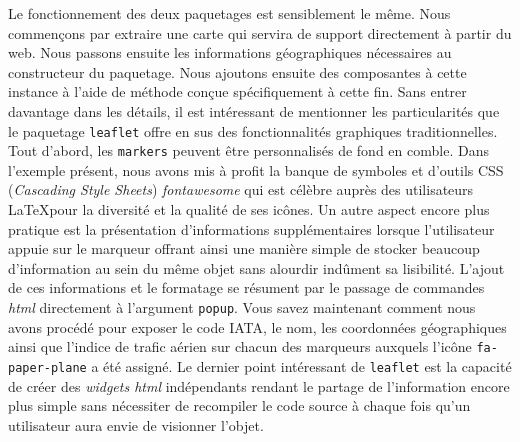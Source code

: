 \vspace{\baselineskip}
Le fonctionnement des deux paquetages est sensiblement le même. Nous commençons par extraire une carte qui servira de support directement à partir du web. Nous passons ensuite les informations géographiques nécessaires au constructeur du paquetage. Nous ajoutons ensuite des composantes à cette instance à l'aide de méthode conçue spécifiquement à cette fin. Sans entrer davantage dans les détails, il est intéressant de mentionner les particularités que le paquetage \texttt{leaflet} offre en sus des fonctionnalités graphiques traditionnelles. \\

Tout d'abord, les \texttt{markers} peuvent être personnalisés de fond en comble. Dans l'exemple présent, nous avons mis à profit la banque de symboles et d'outils CSS (\emph{Cascading Style Sheets}) \emph{fontawesome} \cite{fontAwesome} qui est célèbre auprès des utilisateurs \LaTeX pour la diversité et la qualité de ses icônes. Un autre aspect encore plus pratique est la présentation d'informations supplémentaires lorsque l'utilisateur appuie sur le marqueur offrant ainsi une manière simple de stocker beaucoup d'information au sein du même objet sans alourdir indûment sa lisibilité. L'ajout de ces informations et le formatage se résument par le passage de commandes \emph{html} directement à l'argument \texttt{popup}. Vous savez maintenant comment nous avons procédé pour exposer le code IATA, le nom, les coordonnées géographiques ainsi que l'indice de trafic aérien sur chacun des marqueurs auxquels l'icône \texttt{fa-paper-plane} a été assigné. Le dernier point intéressant de \texttt{leaflet} est la capacité de créer des \emph{widgets html} indépendants rendant le partage de l'information encore plus simple sans nécessiter de recompiler le code source à chaque fois qu'un utilisateur aura envie de visionner l'objet. \cite{leaflet} \\

